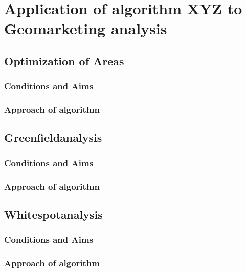 \section{Application of algorithm XYZ to Geomarketing analysis}

\subsection{Optimization of Areas}
\subsubsection{Conditions and Aims}
\subsubsection{Approach of algorithm}

\subsection{Greenfieldanalysis}
\subsubsection{Conditions and Aims}
\subsubsection{Approach of algorithm}

\subsection{Whitespotanalysis}
\subsubsection{Conditions and Aims}
\subsubsection{Approach of algorithm}